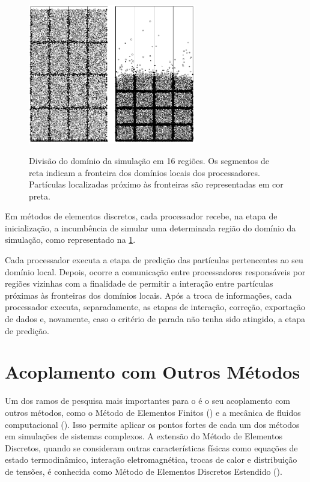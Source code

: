 \begin{figure}[h]
	\caption{Divisão do domínio da simulação em 16 regiões. Os segmentos de reta indicam a fronteira dos domínios locais dos processadores. Partículas localizadas próximo às fronteiras são representadas em cor preta.}
	\centering
		\includegraphics[width=0.65\textwidth]{images/discrete_element_method/parallelization/domain_division}
	\label{fig:discrete_element_method:parallelization}
\end{figure}

Em métodos de elementos discretos, cada processador recebe, na etapa de inicialização, a incumbência de simular uma determinada região do domínio da simulação, como representado na \cref{fig:discrete_element_method:parallelization}.

Cada processador executa a etapa de predição das partículas pertencentes ao seu domínio local. Depois, ocorre a comunicação entre processadores responsáveis por regiões vizinhas com a finalidade de permitir a interação entre partículas próximas às fronteiras dos domínios locais. Após a troca de informações, cada processador executa, separadamente, as etapas de interação, correção, exportação de dados e, novamente, caso o critério de parada não tenha sido atingido, a etapa de predição.

\section{Acoplamento com Outros Métodos} \label{sec:discrete_element_method:coupling_with_other_methods}

Um dos ramos de pesquisa mais importantes para o \DEM{} é o seu acoplamento com outros métodos, como o Método de Elementos Finitos (\FEM{}) e a mecânica de fluidos computacional (\CFD{}). Isso permite aplicar os pontos fortes de cada um dos métodos em simulações de sistemas complexos. A extensão do Método de Elementos Discretos, quando se consideram outras características físicas como equações de estado termodinâmico, interação eletromagnética, trocas de calor e distribuição de tensões, é conhecida como Método de Elementos Discretos Estendido (\XDEM{}).

